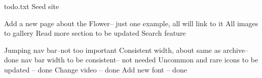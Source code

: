 todo.txt Seed site

Add a new page about the Flower-- just one example, all will link to it
All images to gallery
Read more section to be updated
Search feature


Jumping nav bar--not too important
Consistent width, about same as archive--done
nav bar width to be consistent-- not needed
Uncommon and rare icons to be updated -- done
Change video -- done
Add new font -- done
